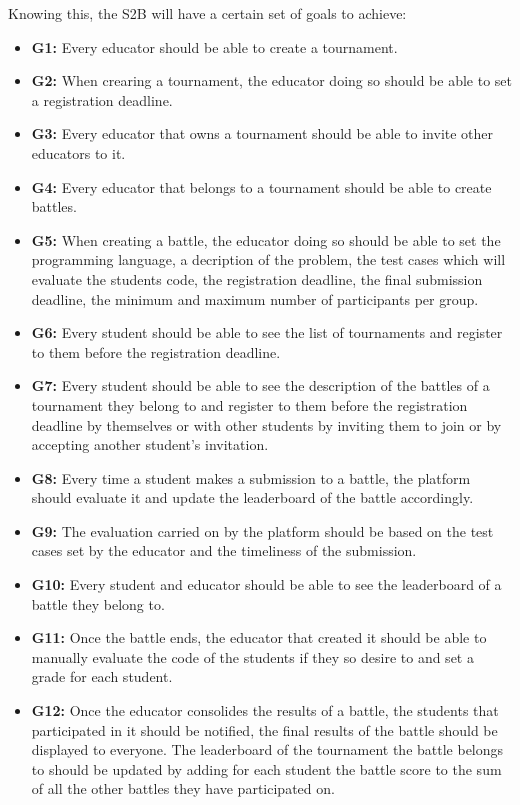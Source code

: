 \documentclass{article}
\begin{document}
Knowing this, the S2B will have a certain set of goals to achieve:
\begin{itemize}
    \item \textbf{G1:} Every educator should be able to create a tournament.
    \item \textbf{G2:} When crearing a tournament, the educator doing so should be able to set a registration deadline.
    \item \textbf{G3:} Every educator that owns a tournament should be able to invite other educators to it.
    \item \textbf{G4:} Every educator that belongs to a tournament should be able to create battles.
    \item \textbf{G5:} When creating a battle, the educator doing so should be able to set the programming language, a decription of the problem, the test cases which will evaluate the students code, the registration deadline, the final submission deadline, the minimum and maximum number of participants per group.
    \item \textbf{G6:} Every student should be able to see the list of tournaments and register to them before the registration deadline.
    \item \textbf{G7:} Every student should be able to see the description of the battles of a tournament they belong to and register to them before the registration deadline by themselves or with other students by inviting them to join or by accepting another student's invitation.
    \item \textbf{G8:} Every time a student makes a submission to a battle, the platform should evaluate it and update the leaderboard of the battle accordingly.
    \item \textbf{G9:} The evaluation carried on by the platform should be based on the test cases set by the educator and the timeliness of the submission.
    \item \textbf{G10:} Every student and educator should be able to see the leaderboard of a battle they belong to.
    \item \textbf{G11:} Once the battle ends, the educator that created it should be able to manually evaluate the code of the students if they so desire to and set a grade for each student.
    \item \textbf{G12:} Once the educator consolides the results of a battle, the students that participated in it should be notified, the final results of the battle should be displayed to everyone. The leaderboard of the tournament the battle belongs to should be updated by adding for each student the battle score to the sum of all the other battles they have participated on.

\end{itemize}
\end{document}
